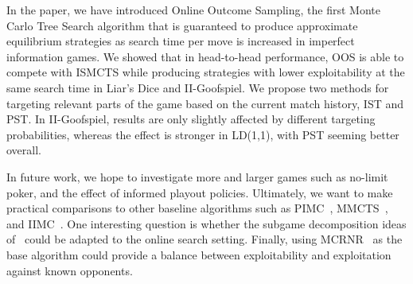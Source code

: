 \documentclass{aamas2015}
\begin{document}
In the paper, we have introduced Online Outcome Sampling, the first Monte Carlo 
Tree Search algorithm that is guaranteed to produce  
approximate equilibrium strategies as search time per move is increased in imperfect information games.
We showed that in head-to-head performance, OOS is able to compete with 
ISMCTS while producing strategies with lower exploitability
at the same search time in Liar's Dice and II-Goofspiel.
We propose two methods for targeting relevant parts of the game based on the current match history, 
IST and PST.
In II-Goofspiel, results are only slightly affected by different targeting probabilities, whereas the
effect is stronger in LD(1,1), with PST seeming better overall.

In future work, we hope to investigate more and larger games such as 
no-limit poker, and the effect of informed playout policies. 
Ultimately, we want to make practical comparisons to other 
baseline algorithms such as 
PIMC~\cite{Long10Understanding}, MMCTS~\cite{Auger11Multiple}, and IIMC~\cite{Furtak13Recursive}.
One interesting question is whether the subgame decomposition ideas of~\cite{Burch14Solving} could be 
adapted to the online search setting. 
Finally, using MCRNR~\cite{Ponsen11Computing} as the base algorithm could provide a balance between 
exploitability and exploitation against known opponents.



%

%
%
\end{document}
